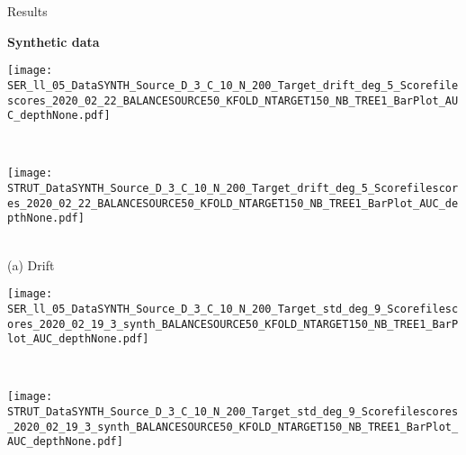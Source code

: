 \begin{frame}{Results}

\centering
\textbf{Synthetic data}

    \renewcommand{\ratio}{1.0}
        \begin{minipage}[t]{0.33\linewidth}\vspace{0pt}
            \centering
            \begin{minipage}[t]{\ratio\linewidth}\vspace{0pt}
            \centerline{\texttt{[image: SER\_ll\_05\_DataSYNTH\_Source\_D\_3\_C\_10\_N\_200\_Target\_drift\_deg\_5\_Scorefilescores\_2020\_02\_22\_BALANCESOURCE50\_KFOLD\_NTARGET150\_NB\_TREE1\_BarPlot\_AUC\_depthNone.pdf]}}
            \end{minipage}\\
            \begin{minipage}[t]{\ratio\linewidth}\vspace{0cm}
            \centerline{\texttt{[image: STRUT\_DataSYNTH\_Source\_D\_3\_C\_10\_N\_200\_Target\_drift\_deg\_5\_Scorefilescores\_2020\_02\_22\_BALANCESOURCE50\_KFOLD\_NTARGET150\_NB\_TREE1\_BarPlot\_AUC\_depthNone.pdf]}}
            \end{minipage}\\
            \medskip
            {\small(a)\; Drift}
        \end{minipage}
        \begin{minipage}[t]{0.33\linewidth}\vspace{0pt}
            \centering
            \begin{minipage}[t]{\ratio\linewidth}\vspace{0pt}
            \centerline{\texttt{[image: SER\_ll\_05\_DataSYNTH\_Source\_D\_3\_C\_10\_N\_200\_Target\_std\_deg\_9\_Scorefilescores\_2020\_02\_19\_3\_synth\_BALANCESOURCE50\_KFOLD\_NTARGET150\_NB\_TREE1\_BarPlot\_AUC\_depthNone.pdf]}}
            \end{minipage}\\
            \begin{minipage}[t]{\ratio\linewidth}\vspace{0cm}
            \centerline{\texttt{[image: STRUT\_DataSYNTH\_Source\_D\_3\_C\_10\_N\_200\_Target\_std\_deg\_9\_Scorefilescores\_2020\_02\_19\_3\_synth\_BALANCESOURCE50\_KFOLD\_NTARGET150\_NB\_TREE1\_BarPlot\_AUC\_depthNone.pdf]}}
            \end{minipage}\\

\end{minipage}
\end{frame}
